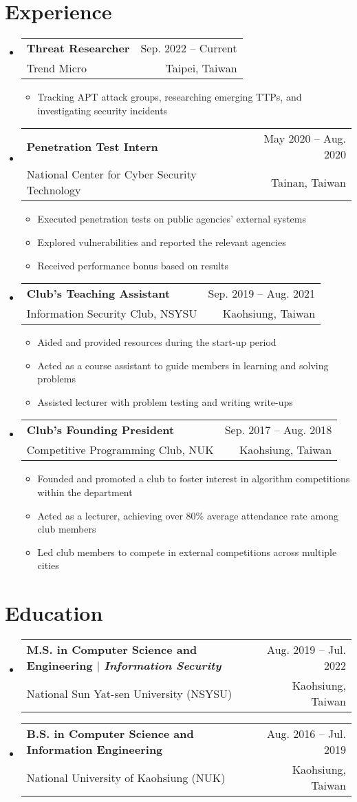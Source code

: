 \documentclass[A4,11pt]{article}
\makeatletter
\newcommand{\CVItem}[1]{
  \item\small{
    {#1 \vspace{-2pt}}
  }
}
\newcommand{\CVSubheading}[4]{
  \vspace{-2pt}\item
    \begin{tabular*}{0.97\textwidth}[t]{l@{\extracolsep{\fill}}r}
      \textbf{#1} & #2 \\
      \small#3 & \small #4 \\
    \end{tabular*}\vspace{-7pt}
}
\newcommand{\CVSubHeadingListStart}{\begin{itemize}[leftmargin=0.5cm, label={}]}
\newcommand{\CVSubHeadingListEnd}{\end{itemize}}
\newcommand{\CVItemListStart}{\begin{itemize}}
\newcommand{\CVItemListEnd}{\end{itemize}\vspace{-5pt}}
\makeatother
\begin{document}
  \section{Experience}
    \CVSubHeadingListStart
      \CVSubheading
        {Threat Researcher}{Sep. 2022 -- Current}
        {Trend Micro}{Taipei, Taiwan}
        \CVItemListStart
          \CVItem{Tracking APT attack groups, researching emerging TTPs, and investigating security incidents}
        \CVItemListEnd
      \CVSubheading
        {Penetration Test Intern}{May 2020 -- Aug. 2020}
        {National Center for Cyber Security Technology}{Tainan, Taiwan}
        \CVItemListStart
          \CVItem{Executed penetration tests on public agencies' external systems}
          \CVItem{Explored vulnerabilities and reported the relevant agencies}
          \CVItem{Received performance bonus based on results}
        \CVItemListEnd
      \CVSubheading
        {Club's Teaching Assistant}{Sep. 2019 -- Aug. 2021}
        {Information Security Club, NSYSU}{Kaohsiung, Taiwan}
        \CVItemListStart
          \CVItem{Aided and provided resources during the start-up period}
          \CVItem{Acted as a course assistant to guide members in learning and solving problems}
          \CVItem{Assisted lecturer with problem testing and writing write-ups}
        \CVItemListEnd
      \CVSubheading
        {Club's Founding President}{Sep. 2017 -- Aug. 2018}
        {Competitive Programming Club, NUK}{Kaohsiung, Taiwan}
        \CVItemListStart
          \CVItem{Founded and promoted a club to foster interest in algorithm competitions within the department}
          \CVItem{Acted as a lecturer, achieving over 80\% average attendance rate among club members}
          \CVItem{Led club members to compete in external competitions across multiple cities}
        \CVItemListEnd
    \CVSubHeadingListEnd

\section{Education}
  \CVSubHeadingListStart
    \CVSubheading
      {M.S. in Computer Science and Engineering $|$ \emph{\small{Information Security}}}{Aug. 2019 -- Jul. 2022}
      {National Sun Yat-sen University (NSYSU)}{Kaohsiung, Taiwan}
    \CVSubheading
      {B.S. in Computer Science and Information Engineering}{Aug. 2016 -- Jul. 2019}
      {National University of Kaohsiung (NUK)}{Kaohsiung, Taiwan}
  \CVSubHeadingListEnd
\end{document}
